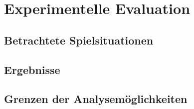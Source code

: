 
\chapter{Experimentelle Evaluation}
\label{chap:evaluation}



\section{Betrachtete Spielsituationen}
\label{sec:benchmarks}


\section{Ergebnisse}
\label{sec:results}


\section{Grenzen der Analysemöglichkeiten}

